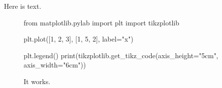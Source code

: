 \documentclass{article}
\begin{document}
\maketitle

Here is text.

\begin{figure}[h]
\centering
\begin{pycode}
from matplotlib.pylab import plt
import tikzplotlib

plt.plot([1, 2, 3], [1, 5, 2], label="x")

plt.legend()
print(tikzplotlib.get_tikz_code(axis_height="5cm", axis_width="6cm"))
\end{pycode}
\caption{It works.}
\end{figure}
\end{document}
